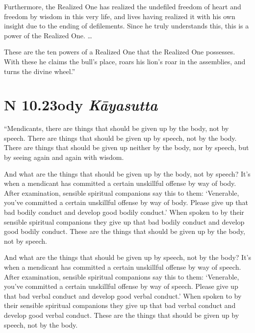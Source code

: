 \documentclass[12pt,openany]{book}%
\newcommand*{\suttatitleacronym}[1]{\smaller[2]{#1}\vspace*{.3em}}
\newcommand*{\suttatitletranslation}[1]{\linebreak{#1}}
\newcommand*{\suttatitleroot}[1]{\linebreak\smaller[2]\itshape{#1}}
\newcommand*{\tocacronym}[1]{\hspace*{-3.3em}{#1}\quad}
\newcommand*{\toctranslation}[1]{#1}
\newcommand*{\tocroot}[1]{(\textit{#1})}
\begin{document}
Furthermore, the Realized One has realized the undefiled freedom of heart and freedom by wisdom in this very life, and lives having realized it with his own insight due to the ending of defilements. Since he truly understands this, this is a power of the Realized One. … 

These are the ten powers of a Realized One that the Realized One possesses. With these he claims the bull’s place, roars his lion’s roar in the assemblies, and turns the divine wheel.” 

%
\section*{{\suttatitleacronym AN 10.23}{\suttatitletranslation Body }{\suttatitleroot Kāyasutta}}
\addcontentsline{toc}{section}{\tocacronym{AN 10.23} \toctranslation{Body } \tocroot{Kāyasutta}}

“Mendicants, there are things that should be given up by the body, not by speech. There are things that should be given up by speech, not by the body. There are things that should be given up neither by the body, nor by speech, but by seeing again and again with wisdom. 

And what are the things that should be given up by the body, not by speech? It’s when a mendicant has committed a certain unskillful offense by way of body. After examination, sensible spiritual companions say this to them: ‘Venerable, you’ve committed a certain unskillful offense by way of body. Please give up that bad bodily conduct and develop good bodily conduct.’ When spoken to by their sensible spiritual companions they give up that bad bodily conduct and develop good bodily conduct. These are the things that should be given up by the body, not by speech. 

And what are the things that should be given up by speech, not by the body? It’s when a mendicant has committed a certain unskillful offense by way of speech. After examination, sensible spiritual companions say this to them: ‘Venerable, you’ve committed a certain unskillful offense by way of speech. Please give up that bad verbal conduct and develop good verbal conduct.’ When spoken to by their sensible spiritual companions they give up that bad verbal conduct and develop good verbal conduct. These are the things that should be given up by speech, not by the body. 
\end{document}
